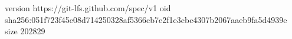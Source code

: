 version https://git-lfs.github.com/spec/v1
oid sha256:051f723f45e08d714250328af5366cb7e2f1e3cbc4307b2067aaeb9fa5d4939e
size 202829
